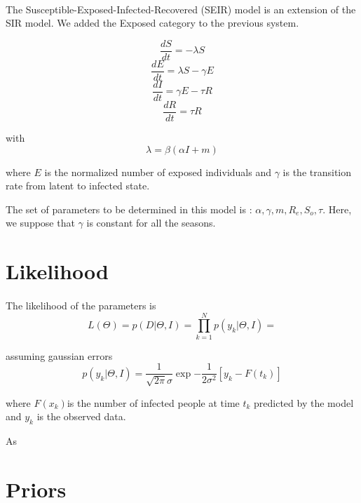\documentclass[11pt, a4paper]{article}
\begin{document}
\paragraph{}
The Susceptible-Exposed-Infected-Recovered (SEIR) model is an extension of the SIR model. We added the Exposed category to the previous system.

\begin{equation}
\frac{dS}{dt} = - \lambda S
\end{equation}
\begin{equation}
\frac{dE}{dt} = \lambda S - \gamma E
\end{equation}
\begin{equation}
\frac{dI}{dt} = \gamma E - \tau R
\end{equation}
\begin{equation}
\frac{dR}{dt} = \tau R
\end{equation}

with \[ \lambda = \beta (\alpha I + m) \]

where $E$ is the normalized number of exposed individuals and $\gamma$ is the transition rate from latent to infected state.

The set of parameters to be determined in this model is : $ { \alpha, \gamma, m, R_e, S_o, \tau }$. Here, we suppose that $\gamma$ is constant for all the seasons.

\section{Likelihood}
\paragraph{}
The likelihood of the parameters is 
\begin{equation}
L(\Theta) =  p(D|\Theta, I) = \prod_{k=1}^N p(y_k | \Theta,I) = 
\end{equation}

assuming gaussian errors
\begin{equation}
p(y_k | \Theta,I) = \frac{1}{\sqrt{2\pi}\sigma} \exp{-\frac{1}{2\sigma^2}[y_k - F(t_k)]}
\end{equation}

where $F(x_k) $is the number of infected people at time $t_k$ predicted by the model and $y_k$ is the observed data.

As

\section{Priors}
\end{document}

